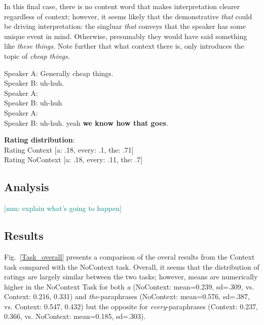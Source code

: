 \documentclass[12pt,letterpaper,table,svgnames,dvipsnames]{article}
\newcommand{\mm}[1]{\textcolor{teal}{[mm: #1]}}
\newcommand{\figref}[1]{Fig.~\ref{#1}}
\begin{document}
In this final case, there is no content word that makes interpretation clearer regardless of context; however, it seems likely that the demonstrative \emph{that} could be driving interpretation: the singluar \emph{that} conveys that the speaker has some unique event in mind. Otherwise, presumably they would have said something like \emph{these things}. Note further that what context there is, only introduces the topic of \emph{cheap things}. 

\begin{exe}
\ex {}
    \begin{xlist}
    \ex {}
    Speaker A: Generally cheap things.\\
    Speaker B: uh-huh.\\
    Speaker A: \\
    Speaker B: uh-huh\\
    Speaker A: \\
    Speaker B: uh-huh. yeah \textbf{we know how that goes}.
    
    \ex \textbf{Rating distribution}:\\
    Rating Context [a: .18, every: .1, the: .71]\\
    Rating NoContext [a: .18, every: .11, the: .7]
    \end{xlist}
\end{exe}


\subsection{Analysis}

\mm{explain what's going to happen}



\subsection{Results}

\figref{Task_overall} presents a comparison of the overal results from the Context task compared with the NoContext task. Overall, it seems that the distribution of ratings are largely similar between the two tasks; however, means are numerically higher in the NoContext Task for both \emph{a} (NoContext: mean=0.239, sd=.309, vs. Context: 0.216, 0.331) and \emph{the}-paraphrases (NoContext: mean=0.576, sd=.387, vs. Context: 0.547, 0.432) but the opposite for \emph{every}-paraphrases (Context: 0.237, 0.366, vs. NoContext: mean=0.185, sd=.303). 
\end{document}

